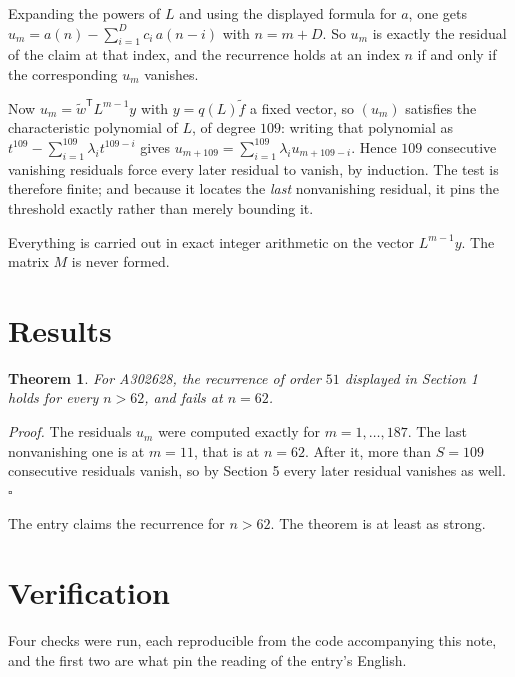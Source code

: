 \documentclass[11pt]{article}
\newtheorem{theorem}{Theorem}
\theoremstyle{definition}
\begin{document}
Expanding the powers of $L$ and using the displayed formula for $a$, one gets $u_m = a(n) - \sum_{i=1}^{D} c_i\,a(n-i)$ with $n = m + D$. So $u_m$ is exactly the residual of the claim at that index, and the recurrence holds at an index $n$ if and only if the corresponding $u_m$ vanishes.

Now $u_m = \tilde w^{\mathsf T} L^{m-1} y$ with $y = q(L)\tilde f$ a fixed vector, so $(u_m)$ satisfies the characteristic polynomial of $L$, of degree $109$: writing that polynomial as $t^{109} - \sum_{i=1}^{109} \lambda_i t^{109-i}$ gives $u_{m+109} = \sum_{i=1}^{109} \lambda_i u_{m+109-i}$. Hence $109$ consecutive vanishing residuals force every later residual to vanish, by induction. The test is therefore finite; and because it locates the {\itshape last} nonvanishing residual, it pins the threshold exactly rather than merely bounding it.

Everything is carried out in exact integer arithmetic on the vector $L^{m-1}y$. The matrix $M$ is never formed.

\section{Results}

\begin{theorem} For A302628, the recurrence of order $51$ displayed in Section 1 holds for every $n > 62$, and fails at $n = 62$.\end{theorem}

{\itshape Proof.} The residuals $u_m$ were computed exactly for $m = 1,\dots,187$. The last nonvanishing one is at $m = 11$, that is at $n = 62$. After it, more than $S = 109$ consecutive residuals vanish, so by Section 5 every later residual vanishes as well. $\square$

The entry claims the recurrence for $n > 62$. The theorem is at least as strong.

\section{Verification}

Four checks were run, each reproducible from the code accompanying this note, and the first two are what pin the reading of the entry's English.
\end{document}
